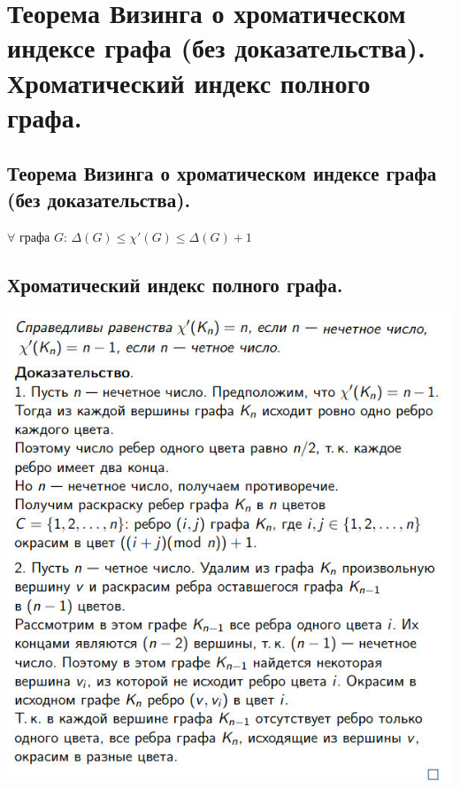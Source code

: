 \documentclass[12pt]{article}
\begin{document}
\section{Теорема Визинга о хроматическом индексе графа (без доказательства). Хроматический индекс полного графа.}
\subsection{Теорема Визинга о хроматическом индексе графа (без доказательства).}
	$\forall$ графа $G$: $\Delta(G) \leqslant \chi'(G) \leqslant \Delta(G) + 1$
\subsection{Хроматический индекс полного графа.}
	\includegraphics[width=400pt]{13}
\end{document}
